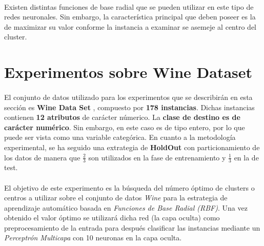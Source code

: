 \documentclass{article}
\begin{document}
			\paragraph{}
			Existen distintas funciones de base radial que se pueden utilizar en este tipo de redes neuronales. Sin embargo, la característica principal que deben poseer es la de maximizar su valor conforme la instancia a examinar se asemeje al centro del cluster.

	\section{Experimentos sobre Wine Dataset}
	\label{sec:e1}

		\paragraph{}
		El conjunto de datos utilizado para los experimentos que se describirán en esta sección es \textbf{Wine Data Set} \cite{dataset:wine}, compuesto por \textbf{178 instancias}. Dichas instancias contienen \textbf{12 atributos} de carácter númerico. La \textbf{clase de destino es de carácter numérico}. Sin embargo, en este caso es de tipo entero, por lo que puede ser vista como una variable categórica. En cuanto a la metodología experimental, se ha seguido una extrategia de \textbf{HoldOut} con particionamiento de los datos de manera que $\frac{2}{3}$ son utilizados en la fase de entrenamiento y $\frac{1}{3}$ en la de test.

		\paragraph{}
		El objetivo de este experimento es la búsqueda del número óptimo de clusters o centros a utilizar sobre el conjunto de datos \emph{Wine} para la estrategia de aprendizaje automático basada en \emph{Funciones de Base Radial (RBF)}. Una vez obtenido el valor óptimo se utilizará dicha red (la capa oculta) como preprocesamiento de la entrada para después clasificar las instancias mediante un \emph{Perceptrón Multicapa} con 10 neuronas en la capa oculta.

\end{document}
